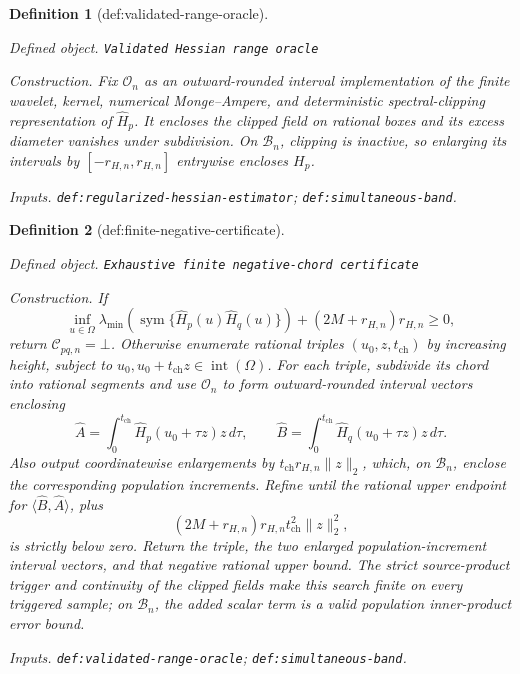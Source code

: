 \documentclass{article}
\newtheorem{definition}{Definition}
\begin{document}
\begin{definition}[def:validated-range-oracle]\label{def:validated-range-oracle}
\par\smallskip\noindent\emph{Defined object.} \texttt{Validated Hessian range oracle}
\par\smallskip\noindent\emph{Construction.} Fix \(\mathcal O_n\) as an outward-rounded interval implementation of the finite wavelet, kernel, numerical Monge--Ampere, and deterministic spectral-clipping representation of \(\widehat H_p\). It encloses the clipped field on rational boxes and its excess diameter vanishes under subdivision. On \(\mathcal B_n\), clipping is inactive, so enlarging its intervals by \([-r_{H,n},r_{H,n}]\) entrywise encloses \(H_p\).
\par\smallskip\noindent\emph{Inputs.} \texttt{def:\allowbreak{}regularized-\allowbreak{}hessian-\allowbreak{}estimator}; \texttt{def:\allowbreak{}simultaneous-\allowbreak{}band}.
\end{definition}

\begin{definition}[def:finite-negative-certificate]\label{def:finite-negative-certificate}
\par\smallskip\noindent\emph{Defined object.} \texttt{Exhaustive finite negative-\allowbreak{}chord certificate}
\par\smallskip\noindent\emph{Construction.} If
\[
 \inf_{u\in\Omega}\lambda_{\min}\!\left(\operatorname{sym}\{\widehat H_p(u)\widehat H_q(u)\}\right)
 +(2M+r_{H,n})r_{H,n}\ge0,
\]
return \(\mathcal C_{pq,n}=\bot\). Otherwise enumerate rational triples \((u_0,z,t_{\mathrm{ch}})\) by increasing height, subject to \(u_0,u_0+t_{\mathrm{ch}}z\in\operatorname{int}(\Omega)\). For each triple, subdivide its chord into rational segments and use \(\mathcal O_n\) to form outward-rounded interval vectors enclosing
\[
 \widehat A=\int_0^{t_{\mathrm{ch}}}\widehat H_p(u_0+\tau z)z\,d\tau,
 \qquad
 \widehat B=\int_0^{t_{\mathrm{ch}}}\widehat H_q(u_0+\tau z)z\,d\tau.
\]
Also output coordinatewise enlargements by \(t_{\mathrm{ch}}r_{H,n}\lVert z\rVert_2\), which, on \(\mathcal B_n\), enclose the corresponding population increments. Refine until the rational upper endpoint for \(\langle\widehat B,\widehat A\rangle\), plus
\[
 (2M+r_{H,n})r_{H,n}t_{\mathrm{ch}}^2\lVert z\rVert_2^2,
\]
is strictly below zero. Return the triple, the two enlarged population-increment interval vectors, and that negative rational upper bound. The strict source-product trigger and continuity of the clipped fields make this search finite on every triggered sample; on \(\mathcal B_n\), the added scalar term is a valid population inner-product error bound.
\par\smallskip\noindent\emph{Inputs.} \texttt{def:\allowbreak{}validated-\allowbreak{}range-\allowbreak{}oracle}; \texttt{def:\allowbreak{}simultaneous-\allowbreak{}band}.
\end{definition}
\end{document}

